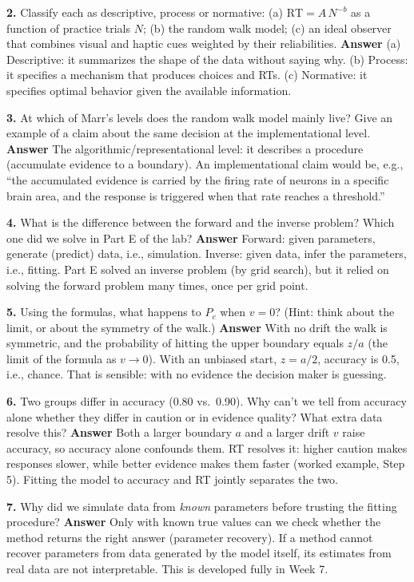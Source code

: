 \textbf{2.} Classify each as descriptive, process or normative: (a)
\(\mathrm{RT} = A\,N^{-b}\) as a function of practice trials \(N\); (b)
the random walk model; (c) an ideal observer that combines visual and
haptic cues weighted by their reliabilities. \textbf{Answer} (a)
Descriptive: it summarizes the shape of the data without saying why. (b)
Process: it specifies a mechanism that produces choices and RTs. (c)
Normative: it specifies optimal behavior given the available
information.

\textbf{3.} At which of Marr's levels does the random walk model mainly
live? Give an example of a claim about the same decision at the
implementational level. \textbf{Answer} The algorithmic/representational
level: it describes a procedure (accumulate evidence to a boundary). An
implementational claim would be, e.g., ``the accumulated evidence is
carried by the firing rate of neurons in a specific brain area, and the
response is triggered when that rate reaches a threshold.''

\textbf{4.} What is the difference between the forward and the inverse
problem? Which one did we solve in Part E of the lab? \textbf{Answer}
Forward: given parameters, generate (predict) data, i.e., simulation.
Inverse: given data, infer the parameters, i.e., fitting. Part E solved
an inverse problem (by grid search), but it relied on solving the
forward problem many times, once per grid point.

\textbf{5.} Using the formulas, what happens to \(P_c\) when \(v = 0\)?
(Hint: think about the limit, or about the symmetry of the walk.)
\textbf{Answer} With no drift the walk is symmetric, and the probability
of hitting the upper boundary equals \(z/a\) (the limit of the formula
as \(v \to 0\)). With an unbiased start, \(z = a/2\), accuracy is 0.5,
i.e., chance. That is sensible: with no evidence the decision maker is
guessing.

\textbf{6.} Two groups differ in accuracy (0.80 vs.~0.90). Why can't we
tell from accuracy alone whether they differ in caution or in evidence
quality? What extra data resolve this? \textbf{Answer} Both a larger
boundary \(a\) and a larger drift \(v\) raise accuracy, so accuracy
alone confounds them. RT resolves it: higher caution makes responses
slower, while better evidence makes them faster (worked example, Step
5). Fitting the model to accuracy and RT jointly separates the two.

\textbf{7.} Why did we simulate data from \emph{known} parameters before
trusting the fitting procedure? \textbf{Answer} Only with known true
values can we check whether the method returns the right answer
(parameter recovery). If a method cannot recover parameters from data
generated by the model itself, its estimates from real data are not
interpretable. This is developed fully in Week 7.

